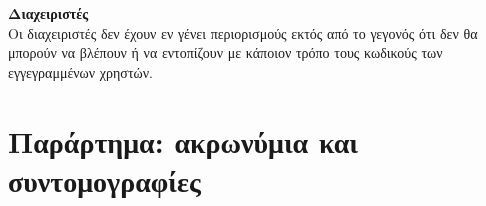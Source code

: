 \documentclass[12pt, oneside, a4paper]{report}
\begin{document}
\vspace{0.5cm}
\textbf{Διαχειριστές}\\

\hspace{0.6cm}Οι διαχειριστές δεν έχουν εν γένει περιορισμούς εκτός από το γεγονός ότι δεν θα μπορούν να βλέπουν ή να εντοπίζουν με κάποιον τρόπο τους κωδικούς των εγγεγραμμένων χρηστών.
% 


\section{Παράρτημα: ακρωνύμια και συντομογραφίες}
\end{document}
